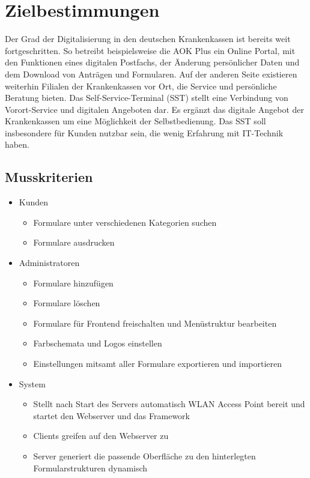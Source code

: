 \section{Zielbestimmungen}

Der Grad der Digitalisierung in den deutschen Krankenkassen ist bereits weit fortgeschritten. So betreibt beispielsweise die AOK Plus ein Online Portal, mit den Funktionen eines digitalen Postfachs, der Änderung persönlicher Daten und dem Download von Anträgen und Formularen. Auf der anderen Seite existieren weiterhin Filialen der Krankenkassen vor Ort, die Service und persönliche Beratung bieten. Das Self-Service-Terminal (SST) stellt eine Verbindung von Vorort-Service und digitalen Angeboten dar. Es ergänzt das digitale Angebot der Krankenkassen um eine Möglichkeit der Selbstbedienung. Das SST soll insbesondere für Kunden nutzbar sein, die wenig Erfahrung mit IT-Technik haben.


\subsection{Musskriterien}

\begin{itemize}
  \item Kunden
    \begin{itemize}
      \item Formulare unter verschiedenen Kategorien suchen
      \item Formulare ausdrucken
    \end{itemize}
  \item Administratoren
    \begin{itemize}
      \item Formulare hinzufügen
      \item Formulare löschen
      \item Formulare für Frontend freischalten und Menüstruktur bearbeiten
      \item Farbschemata und Logos einstellen
      \item Einstellungen mitsamt aller Formulare exportieren und importieren 
    \end{itemize}
  \item System
    \begin{itemize}
        \item Stellt nach Start des Servers automatisch WLAN Access Point bereit und startet den Webserver und das Framework
        \item Clients greifen auf den Webserver zu
        \item Server generiert die passende Oberfläche zu den hinterlegten Formularstrukturen dynamisch 
    \end{itemize}{}
\end{itemize}

